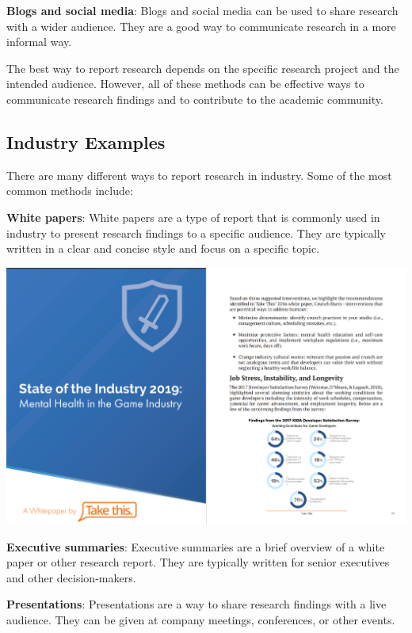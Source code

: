 \documentclass[
]{book}
\begin{document}
\textbf{Blogs and social media}: Blogs and social media can be used to share research with a wider audience. They are a good way to communicate research in a more informal way.

The best way to report research depends on the specific research project and the intended audience. However, all of these methods can be effective ways to communicate research findings and to contribute to the academic community.

\hypertarget{industry-examples}{%
\subsection*{Industry Examples}\label{industry-examples}}

There are many different ways to report research in industry. Some of the most common methods include:

\textbf{White papers}: White papers are a type of report that is commonly used in industry to present research findings to a specific audience. They are typically written in a clear and concise style and focus on a specific topic.

\includegraphics[width=1\textwidth,height=\textheight]{images/white_paper.png}

\textbf{Executive summaries}: Executive summaries are a brief overview of a white paper or other research report. They are typically written for senior executives and other decision-makers.

\textbf{Presentations}: Presentations are a way to share research findings with a live audience. They can be given at company meetings, conferences, or other events.
\end{document}
